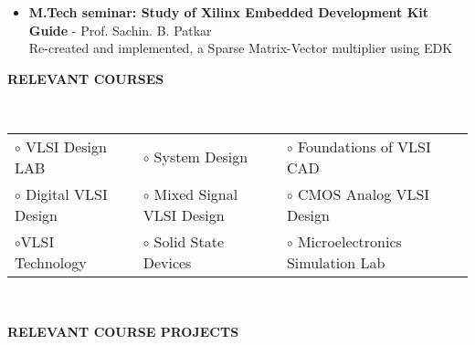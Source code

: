 \documentclass[a4paper,10pt]{article}
\begin{document}
\begin{itemize}
  \item \textbf{{M.Tech seminar: Study of Xilinx Embedded Development Kit}}\\
	{\textbf{Guide} - Prof. Sachin. B. Patkar \qquad\qquad\qquad\quad\qquad\qquad\qquad\quad\qquad\qquad\qquad\qquad\qquad\qquad\quad\\}
	Re-created and implemented, a Sparse Matrix-Vector multiplier using EDK

 \end{itemize}

 \colorbox{titleColor}{\parbox{6.5in}{\textbf{RELEVANT COURSES}}}\\
 
 \begin{tabular}{p{2in}p{2in}p{2.5in}}

$\circ$ VLSI Design LAB &$\circ$ System Design &$\circ$ Foundations of VLSI CAD    \\
$\circ$ Digital VLSI Design &$\circ$ Mixed Signal VLSI Design &$\circ$ CMOS Analog VLSI Design\\
$\circ$VLSI Technology &$\circ$ Solid State Devices &$\circ$ Microelectronics Simulation Lab 
\end{tabular}\\


 \colorbox{titleColor}{\parbox{6.5in}{\textbf{RELEVANT COURSE PROJECTS}}}
\end{document}
